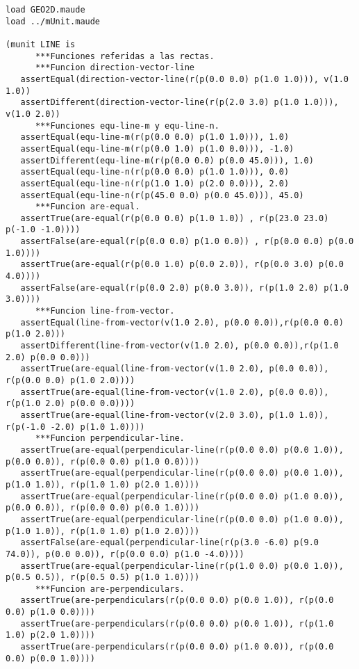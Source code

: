 \begin{verbatim}
load GEO2D.maude
load ../mUnit.maude

(munit LINE is
      ***Funciones referidas a las rectas.
      ***Funcion direction-vector-line
   assertEqual(direction-vector-line(r(p(0.0 0.0) p(1.0 1.0))), v(1.0 1.0))	
   assertDifferent(direction-vector-line(r(p(2.0 3.0) p(1.0 1.0))), v(1.0 2.0))
      ***Funciones equ-line-m y equ-line-n.
   assertEqual(equ-line-m(r(p(0.0 0.0) p(1.0 1.0))), 1.0)
   assertEqual(equ-line-m(r(p(0.0 1.0) p(1.0 0.0))), -1.0)
   assertDifferent(equ-line-m(r(p(0.0 0.0) p(0.0 45.0))), 1.0)
   assertEqual(equ-line-n(r(p(0.0 0.0) p(1.0 1.0))), 0.0)
   assertEqual(equ-line-n(r(p(1.0 1.0) p(2.0 0.0))), 2.0)
   assertEqual(equ-line-n(r(p(45.0 0.0) p(0.0 45.0))), 45.0)
      ***Funcion are-equal.
   assertTrue(are-equal(r(p(0.0 0.0) p(1.0 1.0)) , r(p(23.0 23.0) p(-1.0 -1.0))))
   assertFalse(are-equal(r(p(0.0 0.0) p(1.0 0.0)) , r(p(0.0 0.0) p(0.0 1.0))))
   assertTrue(are-equal(r(p(0.0 1.0) p(0.0 2.0)), r(p(0.0 3.0) p(0.0 4.0))))
   assertFalse(are-equal(r(p(0.0 2.0) p(0.0 3.0)), r(p(1.0 2.0) p(1.0 3.0))))
      ***Funcion line-from-vector.
   assertEqual(line-from-vector(v(1.0 2.0), p(0.0 0.0)),r(p(0.0 0.0) p(1.0 2.0)))
   assertDifferent(line-from-vector(v(1.0 2.0), p(0.0 0.0)),r(p(1.0 2.0) p(0.0 0.0)))
   assertTrue(are-equal(line-from-vector(v(1.0 2.0), p(0.0 0.0)), r(p(0.0 0.0) p(1.0 2.0))))
   assertTrue(are-equal(line-from-vector(v(1.0 2.0), p(0.0 0.0)), r(p(1.0 2.0) p(0.0 0.0))))
   assertTrue(are-equal(line-from-vector(v(2.0 3.0), p(1.0 1.0)), r(p(-1.0 -2.0) p(1.0 1.0))))
      ***Funcion perpendicular-line.
   assertTrue(are-equal(perpendicular-line(r(p(0.0 0.0) p(0.0 1.0)), p(0.0 0.0)), r(p(0.0 0.0) p(1.0 0.0))))
   assertTrue(are-equal(perpendicular-line(r(p(0.0 0.0) p(0.0 1.0)), p(1.0 1.0)), r(p(1.0 1.0) p(2.0 1.0))))
   assertTrue(are-equal(perpendicular-line(r(p(0.0 0.0) p(1.0 0.0)), p(0.0 0.0)), r(p(0.0 0.0) p(0.0 1.0))))
   assertTrue(are-equal(perpendicular-line(r(p(0.0 0.0) p(1.0 0.0)), p(1.0 1.0)), r(p(1.0 1.0) p(1.0 2.0))))
   assertFalse(are-equal(perpendicular-line(r(p(3.0 -6.0) p(9.0 74.0)), p(0.0 0.0)), r(p(0.0 0.0) p(1.0 -4.0))))
   assertTrue(are-equal(perpendicular-line(r(p(1.0 0.0) p(0.0 1.0)), p(0.5 0.5)), r(p(0.5 0.5) p(1.0 1.0))))
      ***Funcion are-perpendiculars.
   assertTrue(are-perpendiculars(r(p(0.0 0.0) p(0.0 1.0)), r(p(0.0 0.0) p(1.0 0.0))))
   assertTrue(are-perpendiculars(r(p(0.0 0.0) p(0.0 1.0)), r(p(1.0 1.0) p(2.0 1.0))))
   assertTrue(are-perpendiculars(r(p(0.0 0.0) p(1.0 0.0)), r(p(0.0 0.0) p(0.0 1.0))))

\end{verbatim}
